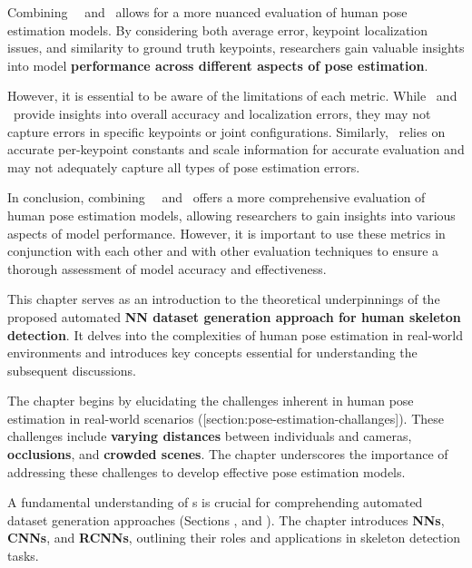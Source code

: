 Combining \OKS\, \APE\ and \MSE\ allows for a more nuanced evaluation of human pose estimation models. By considering both average error, keypoint localization issues, and similarity to ground truth keypoints, researchers gain valuable insights into model {\bf performance across different aspects of pose estimation}.

However, it is essential to be aware of the limitations of each metric. While \APE\ and \MSE\ provide insights into overall accuracy and localization errors, they may not capture errors in specific keypoints or joint configurations. Similarly, \OKS\ relies on accurate per-keypoint constants and scale information for accurate evaluation and may not adequately capture all types of pose estimation errors.

In conclusion, combining \OKS\, \APE\ and \MSE\ offers a more comprehensive evaluation of human pose estimation models, allowing researchers to gain insights into various aspects of model performance. However, it is important to use these metrics in conjunction with each other and with other evaluation techniques to ensure a thorough assessment of model accuracy and effectiveness.

This chapter serves as an introduction to the theoretical underpinnings of the proposed automated {\bf NN dataset generation approach for human skeleton detection}. It delves into the complexities of human pose estimation in real-world environments and introduces key concepts essential for understanding the subsequent discussions.


The chapter begins by elucidating the challenges inherent in human pose estimation in real-world scenarios ([section:pose-estimation-challanges]). These challenges include {\bf varying distances} between individuals and cameras, {\bf occlusions}, and {\bf crowded scenes}. The chapter underscores the importance of addressing these challenges to develop effective pose estimation models.


A fundamental understanding of \NN\-s is crucial for comprehending automated dataset generation approaches (Sections \in[section:nn],  and ). The chapter introduces {\bf NNs}, {\bf CNNs}, and {\bf RCNNs}, outlining their roles and applications in skeleton detection tasks.

